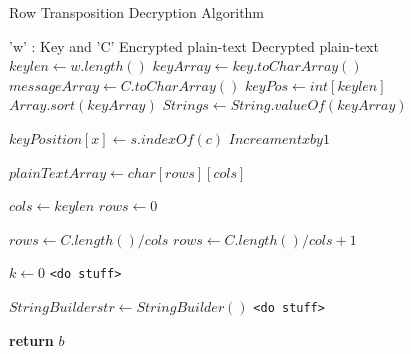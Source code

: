 \documentclass[twoside,twocolumn]{article}
\begin{document}
 {Row Transposition Decryption Algorithm}
\renewcommand{\algorithmicrequire}{\textbf{input:}}
\renewcommand{\algorithmicensure}{\textbf{output:}}
\begin{algorithm}
  \caption{}\label{}
  \begin{algorithmic}[1]
    \Require 'w' : Key and 'C' Encrypted plain-text
    \Ensure Decrypted plain-text
      \State $keylen \gets w.length()$
      \State $keyArray \gets key.toCharArray() $
      \State $messageArray \gets C.toCharArray() $
      \State $keyPos \gets int [keylen]$
	  \State $Array.sort(keyArray)$
	  \State $String s \gets String.valueOf(keyArray)$	  

        \State $keyPosition[x] \gets s.indexOf(c)$
        \State $Increament x by 1$	
      \EndFor
      
      \State $plainTextArray \gets char[rows][cols]$
      
      \State $cols \gets keylen$
      \State $rows \gets 0$
      
        \State $rows \gets C.length() / cols$
      \Else
        \State $rows \gets C.length() / cols + 1$
     \EndIf
 
	  
	  \State $k \gets 0$
        	\State \texttt{<do stuff>}
        \EndFor  
      \EndFor     
      
      \State $ StringBuilder str \gets StringBuilder()$
        	\State \texttt{<do stuff>}
        \EndFor  
      \EndFor    
      
      \State \textbf{return} $b$
    \EndFunction
  \end{algorithmic}
\end{algorithm}
\end{document}
